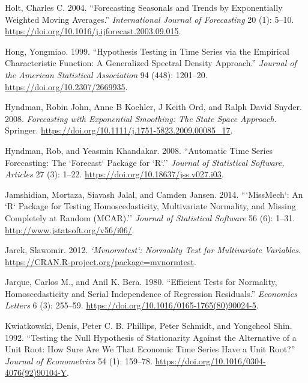 \begin{CSLReferences}{1}{0}
\leavevmode{}%
Holt, Charles C. 2004. {``Forecasting Seasonals and Trends by Exponentially Weighted Moving Averages.''} \emph{International Journal of Forecasting} 20 (1): 5--10. \url{https://doi.org/10.1016/j.ijforecast.2003.09.015}.

\leavevmode{}%
Hong, Yongmiao. 1999. {``Hypothesis Testing in Time Series via the Empirical Characteristic Function: A Generalized Spectral Density Approach.''} \emph{Journal of the American Statistical Association} 94 (448): 1201--20. \url{https://doi.org/10.2307/2669935}.

\leavevmode{}%
Hyndman, Robin John, Anne B Koehler, J Keith Ord, and Ralph David Snyder. 2008. \emph{Forecasting with Exponential Smoothing: The State Space Approach}. Springer. \url{https://doi.org/10.1111/j.1751-5823.2009.00085_17}.

\leavevmode{}%
Hyndman, Rob, and Yeasmin Khandakar. 2008. {``Automatic Time Series Forecasting: The `Forecast` Package for {`R`}.''} \emph{Journal of Statistical Software, Articles} 27 (3): 1--22. \url{https://doi.org/10.18637/jss.v027.i03}.

\leavevmode{}%
Jamshidian, Mortaza, Siavash Jalal, and Camden Jansen. 2014. {```MissMech`: An {`R`} Package for Testing Homoscedasticity, Multivariate Normality, and Missing Completely at Random (MCAR).''} \emph{Journal of Statistical Software} 56 (6): 1--31. \url{http://www.jstatsoft.org/v56/i06/}.

\leavevmode{}%
Jarek, Slawomir. 2012. \emph{`Mvnormtest`: Normality Test for Multivariate Variables}. \url{https://CRAN.R-project.org/package=mvnormtest}.

\leavevmode{}%
Jarque, Carlos M., and Anil K. Bera. 1980. {``Efficient Tests for Normality, Homoscedasticity and Serial Independence of Regression Residuals.''} \emph{Economics Letters} 6 (3): 255--59. \url{https://doi.org/10.1016/0165-1765(80)90024-5}.

\leavevmode{}%
Kwiatkowski, Denis, Peter C. B. Phillips, Peter Schmidt, and Yongcheol Shin. 1992. {``Testing the Null Hypothesis of Stationarity Against the Alternative of a Unit Root: How Sure Are We That Economic Time Series Have a Unit Root?''} \emph{Journal of Econometrics} 54 (1): 159--78. \url{https://doi.org/10.1016/0304-4076(92)90104-Y}.


\end{CSLReferences}

